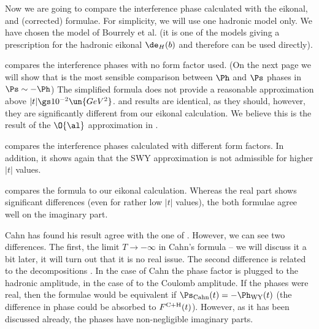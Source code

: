 Now we are going to compare the interference phase calculated with the eikonal, \WY{} and (corrected) \KL{} formulae. For simplicity, we will use one hadronic model only. We have chosen the model of Bourrely et al. (it is one of the models giving a prescription for the hadronic eikonal $\de_H(b)$ and therefore  can be used directly).

 compares the interference phases with no form factor used. (On the next page we will show that is the most sensible comparison between $\Ph$ and $\Ps$ phases in $\Ps \sim - \Ph$) The simplified \WY{} formula does not provide a reasonable approximation above $|t| \gs 10^{-2}\un{GeV^2}$. \WY{} and \KL{} results are identical, as they should, however, they are significantly different from our eikonal calculation. We believe this is the result of the $\O{\al}$ approximation in .

 compares the interference phases calculated with different form factors. In addition, it shows again that the SWY approximation is not admissible for higher $|t|$ values.

 compares the \KL{} formula to our eikonal calculation. Whereas the real part shows significant differences (even for rather low $|t|$ values), the both formulae agree well on the imaginary part.





Cahn has found his result  agree with the one of \WY{} . However, we can see two differences. The first, the limit $T\to -\infty$ in Cahn's formula -- we will discuss it a bit later, it will turn out that it is no real issue. The second difference is related to the decompositions . In the case of Cahn the phase factor is plugged to the hadronic amplitude, in the case of \WaY{} to the Coulomb amplitude. If the phases were real, then the formulae would be equivalent if $\Ps_{\rm Cahn}(t) = - \Ph_{\rm WY}(t)$ (the difference in phase could be absorbed to $F^{\rm C+H}(t)$). However, as it has been discussed already, the phases have non-negligible imaginary parts.

